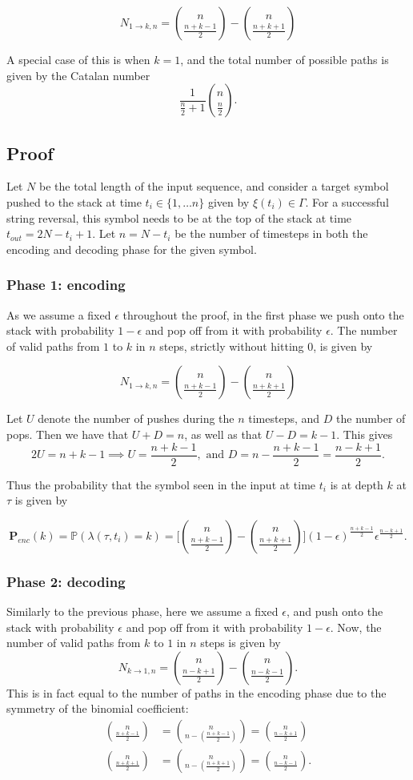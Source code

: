 \documentclass{article}
\newcommand{\eps}{\epsilon}
\begin{document}
$$
N_{1 \rightarrow k,n} = \binom{n}{\frac{n+k - 1}{2}} - \binom{n}{\frac{n+k+1}{2}}
$$

A special case of this is when $k=1$, and the total number of possible paths is given by the Catalan number
$$
\frac{1}{\frac{n}{2}+1}\binom{n}{\frac{n}{2}}.
$$


\subsection{Proof}

Let $N$ be the total length of the input sequence, and consider a target symbol pushed to the stack at time $t_i \in \{1, \dots  n\}$ given by $\xi(t_i) \in \Gamma$. For a successful string reversal, this symbol needs to be at the top of the stack at time $t_{out} = 2N - t_i + 1$. Let $n = N - t_i$ be the number of timesteps in both the encoding and decoding phase for the given symbol. 


\subsubsection*{Phase 1: encoding}

As we assume a fixed $\eps$ throughout the proof, in the first phase we push onto the stack with probability $1- \eps$ and pop off from it with probability $\eps$. The number of valid paths from $1$ to $k$ in $n$ steps, strictly without hitting $0$, is given by 

$$
N_{1 \rightarrow k,n } = \binom{n}{\frac{n+k-1}{2}} - \binom{n}{\frac{n+k+1}{2}}
$$

Let $U$ denote the number of pushes during the $n$ timesteps, and $D$ the number of pops. Then we have that $U+D = n$, as well as that $U - D = k - 1$. This gives 
$$
2U = n + k -1  \implies U = \frac{n + k-1}{2},\text{ and } D =n - \frac{n + k-1}{2} = \frac{n-k+1}{2}.
$$

Thus the probability that the symbol seen in the input at time $t_i$ is at depth $k$ at $\tau$ is given by 

$$
\mathbf{P}_{enc}(k) = \mathbb{P}(\lambda(\tau,t_i) = k) =  \bigg[\binom{n}{\frac{n+k-1}{2}} - \binom{n}{\frac{n+k + 1}{2}}\bigg] (1- \eps)^{\frac{n + k-1}{2}} \eps^{\frac{n-k+1}{2}}.
$$

\subsubsection*{Phase 2: decoding}
Similarly to the previous phase, here we assume a fixed $\eps$, and push onto the stack with probability $\eps$ and pop off from it with probability $1-\eps$. Now, the number of valid paths from $k$ to $1$ in $n$ steps is given by 
$$
N_{k \rightarrow 1,n } = \binom{n}{\frac{n-k+1}{2}} - \binom{n}{\frac{n-k-1}{2}}.
$$ 
This is in fact equal to the number of paths in the encoding phase due to the symmetry of the binomial coefficient:
\begin{align*}
\binom{n}{\frac{n+k-1}{2}} &= \binom{n}{n-(\frac{n+k-1}{2})} = \binom{n}{\frac{n-k+1}{2}} \\
\binom{n}{\frac{n+k+1}{2}} &= \binom{n}{n-(\frac{n+k+1}{2})} = \binom{n}{\frac{n-k-1}{2}}.
\end{align*}
\end{document}
